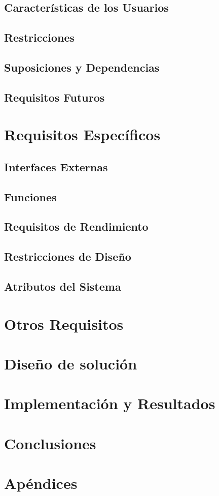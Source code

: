 \documentclass[11pt]{unc_so2}
\begin{document}
\subsection{Características de los Usuarios}
\subsection{Restricciones}
\subsection{Suposiciones y Dependencias}
\subsection{Requisitos Futuros}
\section{Requisitos Específicos}
\subsection{Interfaces Externas}
\subsection{Funciones}
\subsection{Requisitos de Rendimiento}
\subsection{Restricciones de Diseño}
\subsection{Atributos del Sistema}
\section{Otros Requisitos}
\section{Diseño de solución}
\section{Implementación y Resultados}
\section{Conclusiones}
\section{Apéndices}

\printbibliography[heading=subbibintoc]
\end{document}
